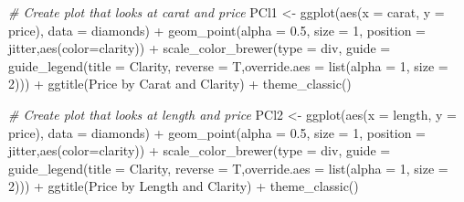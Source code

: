 \documentclass[
]{article}
\newenvironment{Shaded}{\begin{snugshade}}{\end{snugshade}}
\newcommand{\AttributeTok}[1]{\textcolor[rgb]{0.77,0.63,0.00}{#1}}
\newcommand{\CommentTok}[1]{\textcolor[rgb]{0.56,0.35,0.01}{\textit{#1}}}
\newcommand{\DecValTok}[1]{\textcolor[rgb]{0.00,0.00,0.81}{#1}}
\newcommand{\FloatTok}[1]{\textcolor[rgb]{0.00,0.00,0.81}{#1}}
\newcommand{\FunctionTok}[1]{\textcolor[rgb]{0.00,0.00,0.00}{#1}}
\newcommand{\NormalTok}[1]{#1}
\newcommand{\OtherTok}[1]{\textcolor[rgb]{0.56,0.35,0.01}{#1}}
\newcommand{\SpecialCharTok}[1]{\textcolor[rgb]{0.00,0.00,0.00}{#1}}
\newcommand{\StringTok}[1]{\textcolor[rgb]{0.31,0.60,0.02}{#1}}
\begin{document}
\begin{Shaded}
\begin{Highlighting}[]
\CommentTok{\# Create plot that looks at carat and price}
\NormalTok{PCl1 }\OtherTok{\textless{}{-}} \FunctionTok{ggplot}\NormalTok{(}\FunctionTok{aes}\NormalTok{(}\AttributeTok{x =}\NormalTok{ carat, }\AttributeTok{y =}\NormalTok{ price), }\AttributeTok{data =}\NormalTok{ diamonds) }\SpecialCharTok{+} \FunctionTok{geom\_point}\NormalTok{(}\AttributeTok{alpha =} \FloatTok{0.5}\NormalTok{, }\AttributeTok{size =} \DecValTok{1}\NormalTok{, }\AttributeTok{position =} \StringTok{\textquotesingle{}jitter\textquotesingle{}}\NormalTok{,}\FunctionTok{aes}\NormalTok{(}\AttributeTok{color=}\NormalTok{clarity)) }\SpecialCharTok{+}
  \FunctionTok{scale\_color\_brewer}\NormalTok{(}\AttributeTok{type =} \StringTok{\textquotesingle{}div\textquotesingle{}}\NormalTok{, }\AttributeTok{guide =} \FunctionTok{guide\_legend}\NormalTok{(}\AttributeTok{title =} \StringTok{\textquotesingle{}Clarity\textquotesingle{}}\NormalTok{, }\AttributeTok{reverse =}\NormalTok{ T,}\AttributeTok{override.aes =} \FunctionTok{list}\NormalTok{(}\AttributeTok{alpha =} \DecValTok{1}\NormalTok{, }\AttributeTok{size =} \DecValTok{2}\NormalTok{)))       }\SpecialCharTok{+} \FunctionTok{ggtitle}\NormalTok{(}\StringTok{\textquotesingle{}Price by Carat and Clarity\textquotesingle{}}\NormalTok{) }\SpecialCharTok{+} \FunctionTok{theme\_classic}\NormalTok{()}

\CommentTok{\# Create plot that looks at length and price}
\NormalTok{PCl2 }\OtherTok{\textless{}{-}} \FunctionTok{ggplot}\NormalTok{(}\FunctionTok{aes}\NormalTok{(}\AttributeTok{x =}\NormalTok{ length, }\AttributeTok{y =}\NormalTok{ price), }\AttributeTok{data =}\NormalTok{ diamonds) }\SpecialCharTok{+} \FunctionTok{geom\_point}\NormalTok{(}\AttributeTok{alpha =} \FloatTok{0.5}\NormalTok{, }\AttributeTok{size =} \DecValTok{1}\NormalTok{, }\AttributeTok{position =} \StringTok{\textquotesingle{}jitter\textquotesingle{}}\NormalTok{,}\FunctionTok{aes}\NormalTok{(}\AttributeTok{color=}\NormalTok{clarity)) }\SpecialCharTok{+}
  \FunctionTok{scale\_color\_brewer}\NormalTok{(}\AttributeTok{type =} \StringTok{\textquotesingle{}div\textquotesingle{}}\NormalTok{, }\AttributeTok{guide =} \FunctionTok{guide\_legend}\NormalTok{(}\AttributeTok{title =} \StringTok{\textquotesingle{}Clarity\textquotesingle{}}\NormalTok{, }\AttributeTok{reverse =}\NormalTok{ T,}\AttributeTok{override.aes =} \FunctionTok{list}\NormalTok{(}\AttributeTok{alpha =} \DecValTok{1}\NormalTok{, }\AttributeTok{size =} \DecValTok{2}\NormalTok{)))       }\SpecialCharTok{+} \FunctionTok{ggtitle}\NormalTok{(}\StringTok{\textquotesingle{}Price by Length and Clarity\textquotesingle{}}\NormalTok{) }\SpecialCharTok{+} \FunctionTok{theme\_classic}\NormalTok{()}


\end{Highlighting}
\end{Shaded}
\end{document}
